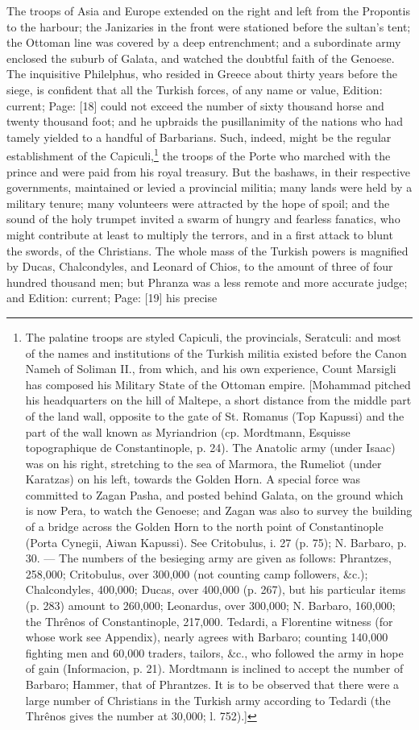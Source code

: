 The troops of Asia and Europe extended on the right and left from the Propontis to the harbour; the Janizaries in the front were stationed before the sultan\texthebrew{}’s tent; the Ottoman line was covered by a deep entrenchment; and a subordinate army enclosed the suburb of Galata, and watched the doubtful faith of the Genoese. The inquisitive Philelphus, who resided in Greece about thirty years before the siege, is confident that all the Turkish forces, of any name or value, Edition: current; Page: [18] could not exceed the number of sixty thousand horse and twenty thousand foot; and he upbraids the pusillanimity of the nations who had tamely yielded to a handful of Barbarians. Such, indeed, might be the regular establishment of the Capiculi,\footnote{The palatine troops are styled Capiculi, the provincials, Seratculi: and most of the names and institutions of the Turkish militia existed before the Canon Nameh of Soliman II., from which, and his own experience, Count Marsigli has composed his Military State of the Ottoman empire. [Mohammad pitched his headquarters on the hill of Maltepe, a short distance from the middle part of the land wall, opposite to the gate of St. Romanus (Top Kapussi) and the part of the wall known as Myriandrion (cp. Mordtmann, Esquisse topographique de Constantinople, p. 24). The Anatolic army (under Isaac) was on his right, stretching to the sea of Marmora, the Rumeliot (under Karatzas) on his left, towards the Golden Horn. A special force was committed to Zagan Pasha, and posted behind Galata, on the ground which is now Pera, to watch the Genoese; and Zagan was also to survey the building of a bridge across the Golden Horn to the north point of Constantinople (Porta Cynegii, Aiwan Kapussi). See Critobulus, i. 27 (p. 75); N. Barbaro, p. 30. \texthebrew{—} The numbers of the besieging army are given as follows: Phrantzes, 258,000; Critobulus, over 300,000 (not counting camp followers, \&c.); Chalcondyles, 400,000; Ducas, over 400,000 (p. 267), but his particular items (p. 283) amount to 260,000; Leonardus, over 300,000; N. Barbaro, 160,000; the Thrênos of Constantinople, 217,000. Tedardi, a Florentine witness (for whose work see Appendix), nearly agrees with Barbaro; counting 140,000 fighting men and 60,000 traders, tailors, \&c., who followed the army in hope of gain (Informacion, p. 21). Mordtmann is inclined to accept the number of Barbaro; Hammer, that of Phrantzes. It is to be observed that there were a large number of Christians in the Turkish army according to Tedardi (the Thrênos gives the number at 30,000; l. 752).]} the troops of the Porte who marched with the prince and were paid from his royal treasury. But the bashaws, in their respective governments, maintained or levied a provincial militia; many lands were held by a military tenure; many volunteers were attracted by the hope of spoil; and the sound of the holy trumpet invited a swarm of hungry and fearless fanatics, who might contribute at least to multiply the terrors, and in a first attack to blunt the swords, of the Christians. The whole mass of the Turkish powers is magnified by Ducas, Chalcondyles, and Leonard of Chios, to the amount of three of four hundred thousand men; but Phranza was a less remote and more accurate judge; and Edition: current; Page: [19] his precise 